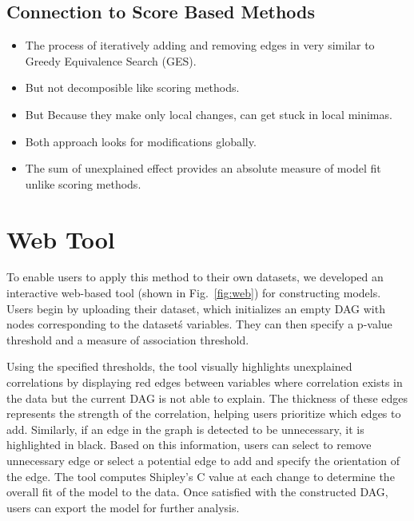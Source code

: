 \documentclass{uai2025} %
\begin{document}
\subsection{Connection to Score Based Methods}
\begin{itemize}
	\item The process of iteratively adding and removing edges in very similar to
		Greedy Equivalence Search (GES).
	\item But not decomposible like scoring methods. 
	\item But Because they make only local changes, can get stuck in local minimas.
	\item Both approach looks for modifications globally.
	\item The sum of unexplained effect provides an absolute measure of model fit 
		unlike scoring methods.
\end{itemize}

\section{Web Tool}
\label{sec:web}
To enable users to apply this method to their own datasets, we developed an
interactive web-based tool (shown in Fig.~\ref{fig:web}) for constructing
models. Users begin by uploading their dataset, which initializes an empty DAG
with nodes corresponding to the dataset\'s variables. They can then specify a
p-value threshold and a measure of association threshold.

Using the specified thresholds, the tool visually highlights unexplained
correlations by displaying red edges between variables where correlation exists
in the data but the current DAG is not able to explain. The thickness of these
edges represents the strength of the correlation, helping users prioritize
which edges to add. Similarly, if an edge in the graph is detected to be
unnecessary, it is highlighted in black. Based on this information, users can
select to remove unnecessary edge or select a potential edge to add and specify
the orientation of the edge. The tool computes Shipley’s C \citep{Shipley2000}
value at each change to determine the overall fit of the model to the data.
Once satisfied with the constructed DAG, users can export the model for further
analysis.
\end{document}
